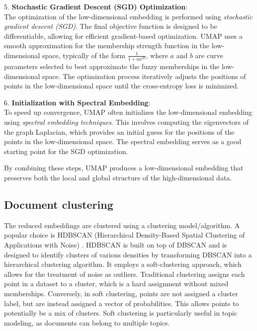 5. \textbf{Stochastic Gradient Descent (SGD) Optimization}:\\
The optimization of the low-dimensional embedding is performed using \textit{stochastic gradient descent (SGD)}. The final objective function is designed to be differentiable, allowing for efficient gradient-based optimization. UMAP uses a smooth approximation for the membership strength function in the low-dimensional space, typically of the form $\frac{1}{1 + a x^{2b}}$, where $a$ and $b$ are curve parameters selected to best approximate the fuzzy memberships in the low-dimensional space. The optimization process iteratively adjusts the positions of points in the low-dimensional space until the cross-entropy loss is minimized.

6. \textbf{Initialization with Spectral Embedding}:\\
To speed up convergence, UMAP often initializes the low-dimensional embedding using \textit{spectral embedding techniques}. This involves computing the eigenvectors of the graph Laplacian, which provides an initial guess for the positions of the points in the low-dimensional space. The spectral embedding serves as a good starting point for the SGD optimization.

By combining these steps, UMAP produces a low-dimensional embedding that preserves both the local and global structure of the high-dimensional data.

\subsection{Document clustering}

The reduced embeddings are clustered using a clustering model/algorithm. A popular choice is HDBSCAN (Hierarchical Density-Based Spatial Clustering of Applications with Noise) \cite{campello_density-based_2013, campello_hierarchical_2015, mcinnes_accelerated_2017, mcinnes_hdbscan_2017}. HDBSCAN is built on top of DBSCAN \cite{ester_density-based_nodate} and is designed to identify clusters of various densities by transforming DBSCAN into a hierarchical clustering algorithm. It employs a soft-clustering approach, which allows for the treatment of noise as outliers. Traditional clustering assigns each point in a dataset to a cluster, which is a hard assignment without mixed memberships. Conversely, in soft clustering, points are not assigned a cluster label, but are instead assigned a vector of probabilities. This allows points to potentially be a mix of clusters. Soft clustering is particularly useful in topic modeling, as documents can belong to multiple topics.


